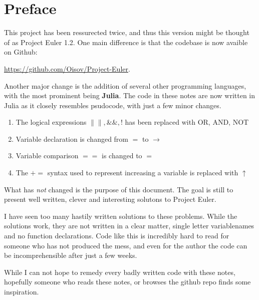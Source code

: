 \section*{Preface}

This project has been ressurected twice, and thus this version might be thought
of as Project Euler 1.2. One main difference is that the codebase is now avaible
on Github:
%
\begin{center}
  \url{https://github.com/Oisov/Project-Euler}.
\end{center}
%
Another major change is the addition of several other programming languages,
with the most prominent being \textbf{Julia}. The code in these notes are now
written in Julia as it closely resembles psudocode, with just a few minor
changes.
%
\begin{enumerate}
    \item The logical expressions $\|\|, \&\&, !$ has been replaced with
          \textsc{OR}, \textsc{AND}, \textsc{NOT}
    \item Variable declaration is changed from $=$ to $\rightarrow$
    \item Variable comparison $==$ is changed to $=$
    \item The $+=$ syntax used to represent increasing a variable is replaced
    with $\uparrow$
\end{enumerate}
%
What has \emph{not} changed is the purpose of this document. The goal is still
to present well written, clever and interesting solutons to Project Euler.

I have seen too many hastily written solutions to these problems. While the
solutions work, they are not written in a clear matter, single letter
variablenames and no function declarations. Code like this is incredibly hard to
read for someone who has not produced the mess, and even for the author the code
can be incomprehensible after just a few weeks.

While I can not hope to remedy every badly written code with these notes,
hopefully someone who reads these notes, or browses the github repo finds some
inspiration. 

